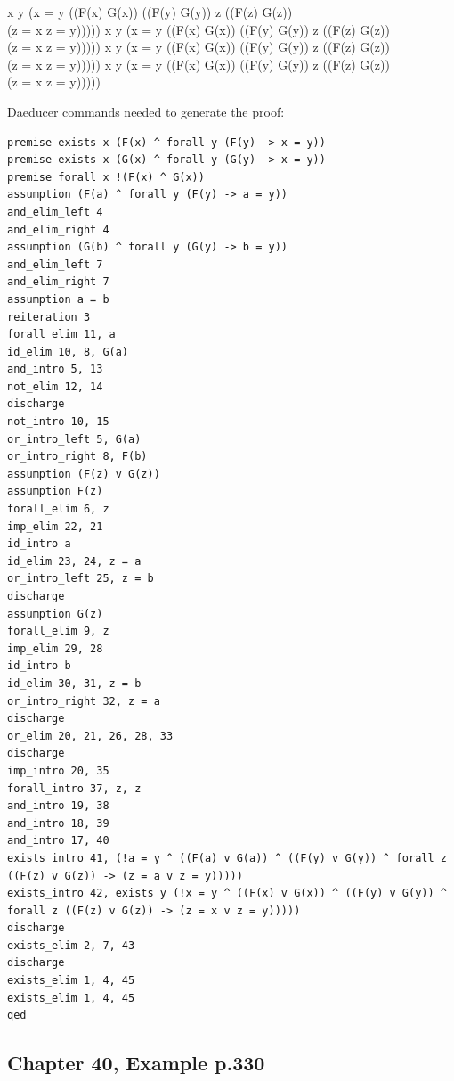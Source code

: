 \documentclass[10pt]{article}
\begin{document}
\begin{fitchproof}[arrayenv=longtable]
   {\exists x \exists y (\neg x = y \land ((F(x) \lor G(x)) \land ((F(y) \lor G(y)) \land \forall z ((F(z) \lor G(z)) \\ \quad \to (z = x \lor z = y)))))} 
  \close
   {\exists x \exists y (\neg x = y \land ((F(x) \lor G(x)) \land ((F(y) \lor G(y)) \land \forall z ((F(z) \lor G(z)) \\ \quad \to (z = x \lor z = y)))))} 
  \close
   {\exists x \exists y (\neg x = y \land ((F(x) \lor G(x)) \land ((F(y) \lor G(y)) \land \forall z ((F(z) \lor G(z)) \\ \quad \to (z = x \lor z = y)))))} 
   {\exists x \exists y (\neg x = y \land ((F(x) \lor G(x)) \land ((F(y) \lor G(y)) \land \forall z ((F(z) \lor G(z)) \\ \quad \to (z = x \lor z = y)))))} 
\end{fitchproof}

Daeducer commands needed to generate the proof:

\begin{lstlisting}[language=Daeducer]
premise exists x (F(x) ^ forall y (F(y) -> x = y))
premise exists x (G(x) ^ forall y (G(y) -> x = y))
premise forall x !(F(x) ^ G(x))
assumption (F(a) ^ forall y (F(y) -> a = y))
and_elim_left 4
and_elim_right 4
assumption (G(b) ^ forall y (G(y) -> b = y))
and_elim_left 7
and_elim_right 7
assumption a = b
reiteration 3
forall_elim 11, a
id_elim 10, 8, G(a)
and_intro 5, 13
not_elim 12, 14
discharge
not_intro 10, 15
or_intro_left 5, G(a)
or_intro_right 8, F(b)
assumption (F(z) v G(z))
assumption F(z)
forall_elim 6, z
imp_elim 22, 21
id_intro a
id_elim 23, 24, z = a
or_intro_left 25, z = b
discharge
assumption G(z)
forall_elim 9, z
imp_elim 29, 28
id_intro b
id_elim 30, 31, z = b
or_intro_right 32, z = a
discharge
or_elim 20, 21, 26, 28, 33
discharge
imp_intro 20, 35
forall_intro 37, z, z
and_intro 19, 38
and_intro 18, 39
and_intro 17, 40
exists_intro 41, (!a = y ^ ((F(a) v G(a)) ^ ((F(y) v G(y)) ^ forall z ((F(z) v G(z)) -> (z = a v z = y)))))
exists_intro 42, exists y (!x = y ^ ((F(x) v G(x)) ^ ((F(y) v G(y)) ^ forall z ((F(z) v G(z)) -> (z = x v z = y)))))
discharge
exists_elim 2, 7, 43
discharge
exists_elim 1, 4, 45
exists_elim 1, 4, 45
qed
\end{lstlisting}

\subsection*{Chapter 40, Example p.330}
\end{document}
